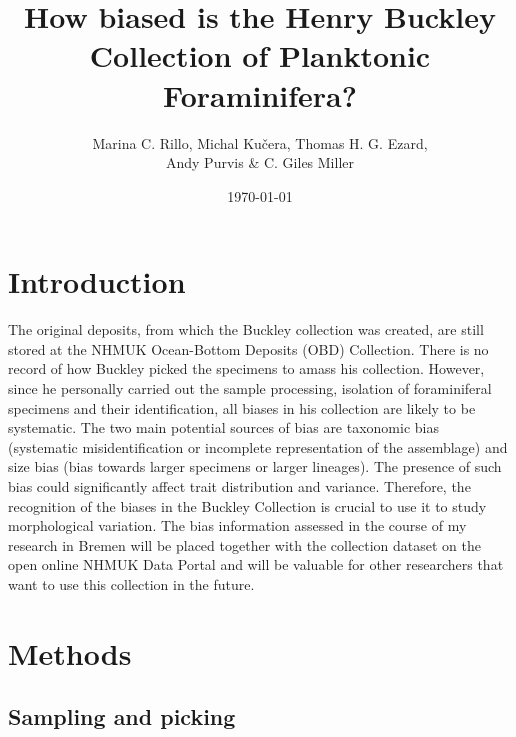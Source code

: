 \documentclass[a4paper]{article}
\title{How biased is the Henry Buckley Collection of Planktonic Foraminifera?}
\author{Marina C. Rillo, Michal Kučera, Thomas H. G. Ezard, \\ Andy Purvis \& C. Giles Miller}
\date{\today}
\begin{document}
\maketitle




\section{Introduction}
\label{sec:introduction}

The original deposits, from which the Buckley collection was created, are still stored at the NHMUK Ocean-Bottom Deposits (OBD) Collection. 
There is no record of how Buckley picked the specimens to amass his collection. However, since he personally carried out the sample processing, isolation of foraminiferal specimens and their identification, all biases in his collection are likely to be systematic. The two main potential sources of bias are taxonomic bias (systematic misidentification or incomplete representation of the assemblage) and size bias (bias towards larger specimens or larger lineages). The presence of such bias could significantly affect trait distribution and variance. Therefore, the recognition of the biases in the Buckley Collection is crucial to use it to study morphological variation. The bias information assessed in the course of my research in Bremen will be placed together with the collection dataset on the open online NHMUK Data Portal and will be valuable for other researchers that want to use this collection in the future.




\section{Methods}
\label{sec:methods}

	\subsection{Sampling and picking}
	
\end{document}
